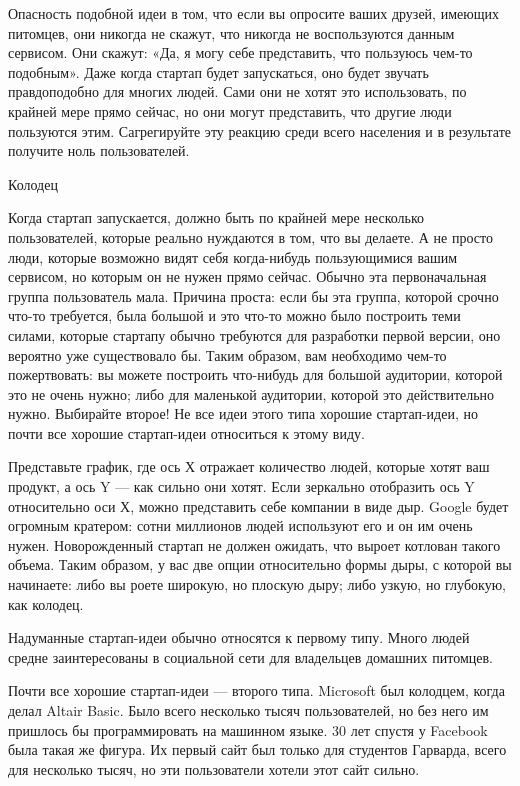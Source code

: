 \documentclass[ebook,12pt,oneside,openany]{memoir}
\begin{document}
Опасность подобной идеи в том, что если вы опросите ваших друзей,
имеющих питомцев, они никогда не скажут, что никогда не воспользуются
данным сервисом. Они скажут: «Да, я могу себе представить, что
пользуюсь чем-то подобным». Даже когда стартап будет запускаться, оно
будет звучать правдоподобно для многих людей. Сами они не хотят это
использовать, по крайней мере прямо сейчас, но они могут представить,
что другие люди пользуются этим. Сагрегируйте эту реакцию среди всего
населения и в результате получите ноль пользователей.

Колодец

Когда стартап запускается, должно быть по крайней мере несколько
пользователей, которые реально нуждаются в том, что вы делаете. А не
просто люди, которые возможно видят себя когда-нибудь пользующимися
вашим сервисом, но которым он не нужен прямо сейчас. Обычно эта
первоначальная группа пользователь мала. Причина проста: если бы эта
группа, которой срочно что-то требуется, была большой и это что-то
можно было построить теми силами, которые стартапу обычно требуются
для разработки первой версии, оно вероятно уже существовало бы. Таким
образом, вам необходимо чем-то пожертвовать: вы можете построить
что-нибудь для большой аудитории, которой это не очень нужно; либо для
маленькой аудитории, которой это действительно нужно. Выбирайте
второе! Не все идеи этого типа хорошие стартап-идеи, но почти все
хорошие стартап-идеи относиться к этому виду.

Представьте график, где ось Х отражает количество людей, которые хотят
ваш продукт, а ось Y — как сильно они хотят. Если зеркально отобразить
ось Y относительно оси Х, можно представить себе компании в виде дыр.
Google будет огромным кратером: сотни миллионов людей используют его и
он им очень нужен. Новорожденный стартап не должен ожидать, что выроет
котлован такого объема. Таким образом, у вас две опции относительно
формы дыры, с которой вы начинаете: либо вы роете широкую, но плоскую
дыру; либо узкую, но глубокую, как колодец.

Надуманные стартап-идеи обычно относятся к первому типу. Много людей
средне заинтересованы в социальной сети для владельцев домашних
питомцев.

Почти все хорошие стартап-идеи — второго типа. Microsoft был колодцем,
когда делал Altair Basic. Было всего несколько тысяч пользователей, но
без него им пришлось бы программировать на машинном языке. 30 лет
спустя у Facebook была такая же фигура. Их первый сайт был только для
студентов Гарварда, всего для несколько тысяч, но эти пользователи
хотели этот сайт сильно.
\end{document}
